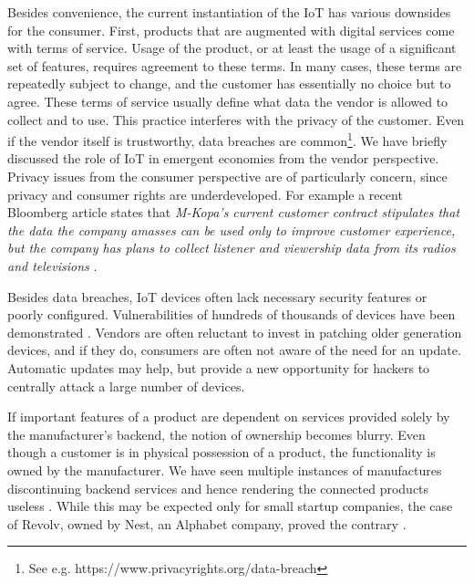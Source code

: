 Besides convenience, the current instantiation of the IoT has various downsides for the consumer. First, products that are augmented with digital services come with terms of service. Usage of the product, or at least the usage of a significant set of features, requires agreement to these terms. In many cases, these terms are repeatedly subject to change, and the customer has essentially no choice but to agree. These terms of service usually define what data the vendor is allowed to collect and to use.
This practice interferes with the privacy of the customer. Even if the vendor itself is trustworthy, data breaches are common\footnote{See e.g. https://www.privacyrights.org/data-breach}. We have briefly discussed the role of IoT in emergent economies from the vendor perspective. Privacy issues from the consumer perspective are of particularly concern, since privacy and consumer rights are underdeveloped. For example a recent Bloomberg article states that \emph{M-Kopa’s current customer contract stipulates that the data the company amasses can be used only to improve customer experience, but the company has plans to collect listener and viewership data from its radios and televisions} \parencite{Faris2015}. 

Besides data breaches, IoT devices often lack necessary security features or poorly configured. Vulnerabilities of hundreds of thousands of devices have been demonstrated \parencite{7546527,Bodenheim2014114,184449,garcia2016lock}. Vendors are often reluctant to invest in patching older generation devices, and if they do, consumers are often not aware of the need for an update. Automatic updates may help, but provide a new opportunity for hackers to centrally attack a large number of devices.

If important features of a product are dependent on services provided solely by the manufacturer's backend, the notion of ownership becomes blurry. Even though a customer is in physical possession of a product, the functionality is owned by the manufacturer. We have seen multiple instances of manufactures discontinuing backend services and hence rendering the connected products useless \parencite{Cox2016}. While this may be expected only for small startup companies, the case of Revolv, owned by Nest, an Alphabet company, proved the contrary \parencite{Gilbert2016}.


